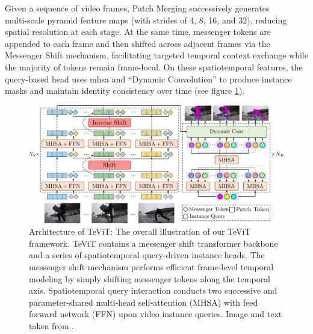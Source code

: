 Given a sequence of video frames, Patch Merging successively generates multi‑scale pyramid feature maps (with strides of 4, 8, 16, and 32), reducing spatial resolution at each stage. At the same time, messenger tokens are appended to each frame and then shifted across adjacent frames via the Messenger Shift mechanism, facilitating targeted temporal context exchange while the majority of tokens remain frame-local. On these spatiotemporal features, the query-based head uses \gls{mhsa} and \enquote{Dynamic Convolution} to produce instance masks and maintain identity consistency over time (see figure \ref{Architecture_of_TeViT}).

\begin{figure}[H]
	\centering
	\includegraphics[width=1.0\textwidth]{./images/TeViT_architecture.pdf}
	\caption[Architecture of TeViT]{Architecture of TeViT: The overall illustration of our TeViT framework. TeViT contains a messenger shift transformer backbone and a series of
		spatiotemporal query-driven instance heads. The messenger shift mechanism performs efficient frame-level temporal modeling by simply shifting messenger tokens along the temporal axis. Spatiotemporal query interaction conducts two successive and parameter-shared
		multi-head self-attention (MHSA) with feed forward network (FFN) upon video instance queries. Image and text taken from \cite{yang2022temporallyefficientvisiontransformer}.}
	\label{Architecture_of_TeViT}
\end{figure}





